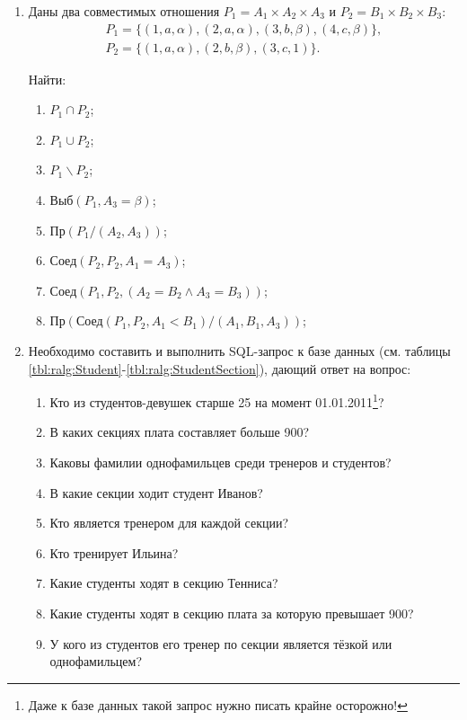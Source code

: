 \begin{enumerate}
    \item Даны два совместимых отношения $P_1=A_1\times A_2\times A_3$ и $P_2=B_1\times B_2\times B_3$:
    \[
        \begin{split}
            P_1=\{
                (1,a,\alpha),
                (2,a,\alpha),
                (3,b,\beta),
                (4,c,\beta)
            \},\\
            P_2=\{
                (1,a,\alpha),
                (2,b,\beta),
                (3,c,1)
            \}.
        \end{split}
    \]

    Найти:
    \begin{enumerate}
        \item $P_1\cap P_2$;
        \item $P_1\cup P_2$;
        \item $P_1\backslash P_2$;
        \item $\text{Выб}(P_1,A_3=\beta)$;
        \item $\text{Пр}(P_1/(A_2,A_3))$;
        \item $\text{Соед}(P_2,P_2,A_1=A_3)$;
        \item $\text{Соед}(P_1,P_2,(A_2=B_2\land A_3=B_3))$;
        \item $\text{Пр}(\text{Соед}(P_1,P_2,A_1<B_1)/(A_1,B_1,A_3))$;
    \end{enumerate}
    
    \item Необходимо составить и выполнить SQL-запрос к базе данных (см. таблицы \ref{tbl:ralg:Student}-\ref{tbl:ralg:StudentSection}), дающий ответ на вопрос:
    \begin{enumerate}
        \item Кто из студентов-девушек старше 25 на момент 01.01.2011\footnote{Даже к базе данных такой запрос нужно писать крайне осторожно!}?
        \item В каких секциях плата составляет больше 900?
        \item Каковы фамилии однофамильцев среди тренеров и студентов?
        \item В какие секции ходит студент Иванов?
        \item Кто является тренером для каждой секции?
        \item Кто тренирует Ильина?
        \item Какие студенты ходят в секцию Тенниса?
        \item Какие студенты ходят в секцию плата за которую превышает 900?
        \item У кого из студентов его тренер по секции является тёзкой или однофамильцем?
    \end{enumerate}
    

\end{enumerate}
